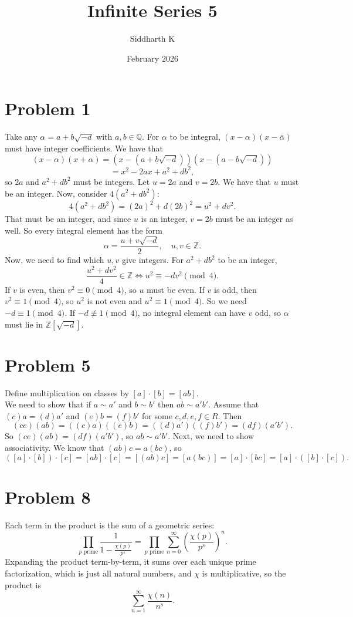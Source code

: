 \documentclass{article}
\title{Infinite Series 5}
\author{Siddharth K}
\date{February 2026}
\newcommand{\Z}{\mathbb{Z}}
\newcommand{\Q}{\mathbb{Q}}
\newcommand{\bigp}[1]{\left(#1\right)}
\newcommand{\summation}[1][0]{\sum_{n=#1}^\infty}
\begin{document}
\maketitle

\section*{Problem 1}
Take any $\alpha = a + b\sqrt {-d}$ with $a, b \in \Q$. For $\alpha$ to be integral, $(x - \alpha)(x - \bar\alpha)$ must have integer coefficients. We have that
$$(x - \alpha)(x + \alpha) = (x - (a + b\sqrt{-d}))(x - (a - b\sqrt{-d}))$$
$$= x^2 - 2ax + a^2 + db^2,$$
so $2a$ and $a^2 + db^2$ must be integers. Let $u = 2a$ and $v = 2b$. We have that $u$ must be an integer. Now, consider $4(a^2 + db^2)$:
$$4(a^2 + db^2) = (2a)^2 + d(2b)^2 = u^2 + dv^2.$$
That must be an integer, and since $u$ is an integer, $v = 2b$ must be an integer as well. So every integral element has the form
$$\alpha = \frac{u + v\sqrt{-d}}{2},\quad u, v \in \Z.$$
Now, we need to find which $u, v$ give integers. For $a^2 + db^2$ to be an integer,
$$\frac{u^2 + dv^2}{4} \in \Z \iff u^2 \equiv -dv^2 \pmod{4}.$$
If $v$ is even, then $v^2 \equiv 0 \pmod{4}$, so $u$ must be even. If $v$ is odd, then $v^2 \equiv 1 \pmod{4}$, so $u^2$ is not even and $u^2 \equiv 1 \pmod{4}$. So we need $-d \equiv 1 \pmod{4}$. If $-d \not\equiv 1 \pmod{4}$, no integral element can have $v$ odd, so $\alpha$ must lie in $\Z[\sqrt{-d}]$.

\section*{Problem 5}
Define multiplication on classes by $[a] \cdot [b] = [ab]$. \\
We need to show that if $a \sim a'$ and $b \sim b'$ then $ab \sim a'b'$. Assume that $(c)a = (d)a'$ and $(e)b = (f)b'$ for some $c, d, e, f \in R$. Then
$$(ce)(ab) = ((c)a)((e)b) = ((d)a')((f)b') = (df)(a'b').$$
So $(ce)(ab) = (df)(a'b')$, so $ab \sim a'b'$.
Next, we need to show associativity. We know that $(ab)c = a(bc)$, so
$$([a] \cdot [b]) \cdot [c] = [ab] \cdot [c] = [(ab)c] = [a(bc)] = [a] \cdot [bc] = [a] \cdot ([b] \cdot [c]).$$

\section*{Problem 8}
Each term in the product is the sum of a geometric series:
$$\prod_{p \text{ prime}} \frac{1}{1 - \frac{\chi(p)}{p^s}} = \prod_{p \text{ prime}} \summation \bigp{\frac{\chi(p)}{p^s}}^n.$$
Expanding the product term-by-term, it sums over each unique prime factorization, which is just all natural numbers, and $\chi$ is multiplicative, so the product is
$$\summation[1] \frac{\chi(n)}{n^s}.$$
\end{document}
